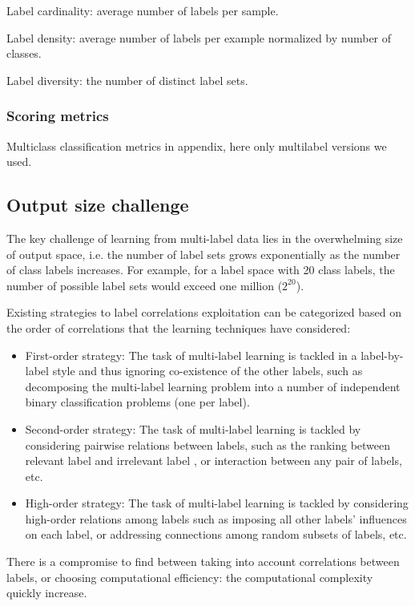 Label cardinality: average number of labels per sample.

Label density: average number of labels per example normalized by number of classes.

Label diversity: the number of distinct label sets.

\subsubsection{Scoring metrics}

Multiclass classification metrics in appendix, here only multilabel versions we used.


\subsection{Output size challenge}

The key challenge of learning from multi-label data lies in the overwhelming size of output space, i.e. the number of label sets grows exponentially as the number of class labels increases. For example, for a label space with 20 class labels, the number of possible label sets would exceed one million ($2^{20}$).

Existing strategies to label correlations exploitation can be categorized based on the order of correlations that the learning techniques have considered:
\begin{itemize}
	\item First-order strategy: The task of multi-label learning is tackled in a label-by-label style and thus ignoring co-existence of the other labels, such as decomposing the multi-label learning problem into a number of independent binary classification problems (one per label). 
	\item Second-order strategy: The task of multi-label learning is tackled by considering pairwise relations between labels, such as the ranking between relevant label and irrelevant label , or interaction between any pair of labels, etc.
	\item High-order strategy: The task of multi-label learning is tackled by considering high-order relations among labels such as imposing all other labels’ influences on each label, or addressing connections among random subsets of labels, etc.
\end{itemize}

There is a compromise to find between taking into account correlations between labels, or choosing computational efficiency: the computational complexity quickly increase.

